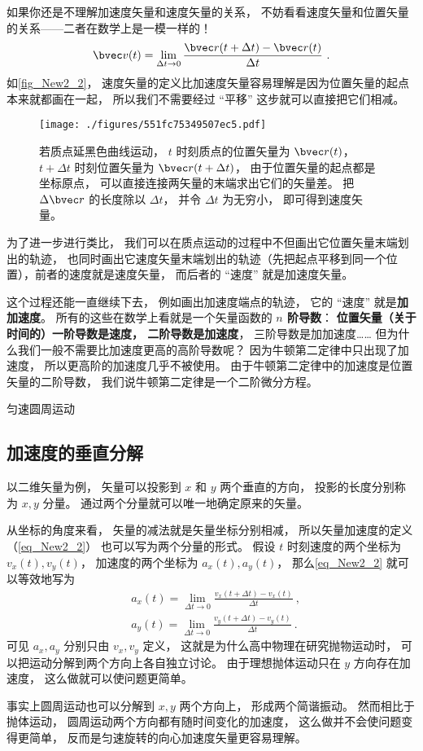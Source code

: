 如果你还是不理解加速度矢量和速度矢量的关系， 不妨看看速度矢量和位置矢量的关系——二者在数学上是一模一样的！
\begin{equation}
\bvec v(t) = \lim_{\Delta t\to 0}\frac{\bvec r(t+\Delta t) - \bvec r(t)}{\Delta t}~.
\end{equation}
如\autoref{fig_New2_2}， 速度矢量的定义比加速度矢量容易理解是因为位置矢量的起点本来就都画在一起， 所以我们不需要经过 “平移” 这步就可以直接把它们相减。
\begin{figure}[ht]
\centering
\texttt{[image: ./figures/551fc75349507ec5.pdf]}
\caption{若质点延黑色曲线运动， $t$ 时刻质点的位置矢量为 $\bvec r(t)$，$t+\Delta t$ 时刻位置矢量为 $\bvec r(t+\Delta t)$， 由于位置矢量的起点都是坐标原点， 可以直接连接两矢量的末端求出它们的矢量差。 把 $\Delta \bvec r$ 的长度除以 $\Delta t$， 并令 $\Delta t$ 为无穷小， 即可得到速度矢量。} \label{fig_New2_2}
\end{figure}

为了进一步进行类比， 我们可以在质点运动的过程中不但画出它位置矢量末端划出的轨迹， 也同时画出它速度矢量末端划出的轨迹（先把起点平移到同一个位置），前者的速度就是速度矢量， 而后者的 “速度” 就是加速度矢量。

这个过程还能一直继续下去， 例如画出加速度端点的轨迹， 它的 “速度” 就是\textbf{加加速度}。 所有的这些在数学上看就是一个矢量函数的\textbf{ $n$ 阶导数}： \textbf{位置矢量（关于时间的）一阶导数是速度， 二阶导数是加速度}， 三阶导数是加加速度…… 但为什么我们一般不需要比加速度更高的高阶导数呢？ 因为牛顿第二定律中只出现了加速度， 所以更高阶的加速度几乎不被使用。 由于牛顿第二定律中的加速度是位置矢量的二阶导数， 我们说牛顿第二定律是一个二阶微分方程。

\begin{example}{匀速圆周运动}
\end{example}

\subsection{加速度的垂直分解}

以二维矢量为例， 矢量可以投影到 $x$ 和 $y$ 两个垂直的方向， 投影的长度分别称为 $x, y$ 分量。 通过两个分量就可以唯一地确定原来的矢量。

从坐标的角度来看， 矢量的减法就是矢量坐标分别相减， 所以矢量加速度的定义（\autoref{eq_New2_2}） 也可以写为两个分量的形式。 假设 $t$ 时刻速度的两个坐标为 $v_x(t), v_y(t)$， 加速度的两个坐标为 $a_x(t), a_y(t)$， 那么\autoref{eq_New2_2} 就可以等效地写为
\begin{equation}
\begin{aligned}
&a_x(t) = \lim_{\Delta t\to 0}\frac{v_x(t+\Delta t) - v_x(t)}{\Delta t}~,\\
&a_y(t) = \lim_{\Delta t\to 0}\frac{v_y(t+\Delta t) - v_y(t)}{\Delta t}~.
\end{aligned}
\end{equation}
可见 $a_x,a_y$ 分别只由 $v_x,v_y$ 定义， 这就是为什么高中物理在研究抛物运动时， 可以把运动分解到两个方向上各自独立讨论。 由于理想抛体运动只在 $y$ 方向存在加速度， 这么做就可以使问题更简单。

事实上圆周运动也可以分解到 $x,y$ 两个方向上， 形成两个简谐振动。 然而相比于抛体运动， 圆周运动两个方向都有随时间变化的加速度， 这么做并不会使问题变得更简单， 反而是匀速旋转的向心加速度矢量更容易理解。
